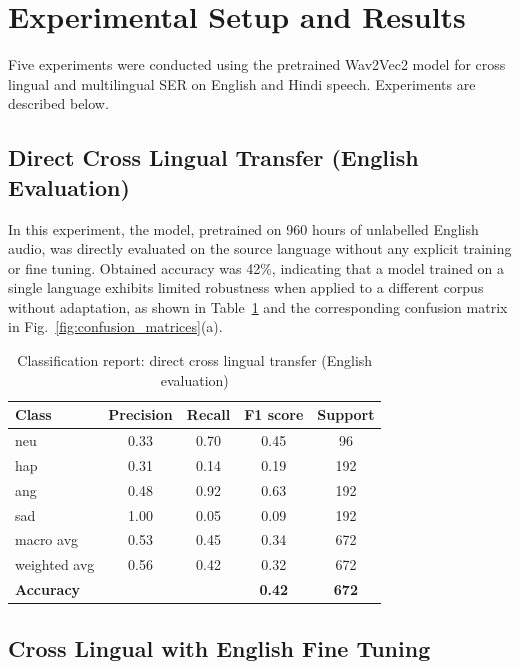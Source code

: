 \documentclass[runningheads]{llncs}
\begin{document}
\section{Experimental Setup and Results}
\label{sec:results}

Five experiments were conducted using the pretrained Wav2Vec2 model for cross lingual and multilingual SER on English and Hindi speech. Experiments are described below.

\subsection{Direct Cross Lingual Transfer (English Evaluation)}

In this experiment, the model, pretrained on 960 hours of unlabelled English audio, was directly evaluated on the source language without any explicit training or fine tuning. Obtained accuracy was 42\%, indicating that a model trained on a single language exhibits limited robustness when applied to a different corpus without adaptation, as shown in Table~\ref{tab:cr_A} and the corresponding confusion matrix in Fig.~\ref{fig:confusion_matrices}(a).

\begin{table}[htbp]
\centering
\caption{Classification report: direct cross lingual transfer (English evaluation)}
\label{tab:cr_A}
\renewcommand{\arraystretch}{1.2}
\begin{tabular}{lcccc}
\toprule
\textbf{Class} & \textbf{Precision} & \textbf{Recall} & \textbf{F1 score} & \textbf{Support} \\
\midrule
neu           & 0.33 & 0.70 & 0.45 & 96  \\
hap           & 0.31 & 0.14 & 0.19 & 192 \\
ang           & 0.48 & 0.92 & 0.63 & 192 \\
sad           & 1.00 & 0.05 & 0.09 & 192 \\
\midrule
macro avg     & 0.53 & 0.45 & 0.34 & 672 \\
weighted avg  & 0.56 & 0.42 & 0.32 & 672 \\
\midrule
\textbf{Accuracy} & & & \textbf{0.42} & \textbf{672} \\
\bottomrule
\end{tabular}
\end{table}

\subsection{Cross Lingual with English Fine Tuning}
\end{document}
